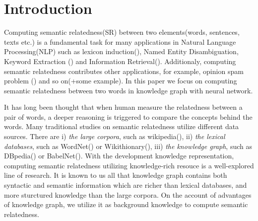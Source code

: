 \section{Introduction}
Computing semantic relatedness(SR) between two elements(words, sentences,
texts etc.) is a fundamental task for many applications in Natural Language
Processing(NLP) such as lexicon induction(\cite{aaai/QadirMGL15}), Named 
Entity Disambiguation{\cite{acl/HanZ10}}, Keyword Extraction
(\cite{ijcai/ZhangFW13}) and Information Retrieval(\cite{acl/GurevychMZ07}). 
Additionaly, computing semantic relatedness contributes other applications, 
for example, opinion spam problem (\cite{www/SandulescuE15}) and so on(+some example). 
In this paper we focus on computing semantic relatedness between two 
words in knowledge graph with neural network.

It has long been thought that when human measure the relatedness between
a pair of words, a deeper reasoning is triggered to compare the concepts
behind the words. Many traditional studies on semantic relatedness
utilize different data sources. There are
i) \emph{the large corpora}, such as wikipedia(\cite{ijcai/GabrilovichM07}), 
ii) \emph{the lexical databases}, such as WordNet(\cite{acl/Pucher07}) or Wikithionary(\cite{aaai/ZeschMG08}), 
iii) \emph{the knowledge graph}, such as DBpedia(\cite{aaai/NavigliP12}) or BabelNet(\cite{aaai/NavigliP12}).
With the development knowledge representation, computing semantic relatedness utilizing
knowledge-rich resouce is a well-explored line of research. It is known to us all that
knowledge graph contains both syntactic and semantic information which are 
richer than lexical databases, and more sturctured knowledge than the large corpora.
On the account of advantages of knowledge graph, we utilize it as background 
knowledge to compute semantic relatedness.


